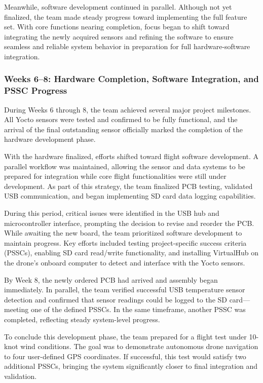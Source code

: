 \documentclass[12pt]{article}
\begin{document}
Meanwhile, software development continued in parallel. Although not yet finalized, the team made steady progress toward implementing the full feature set. With core functions nearing completion, focus began to shift toward integrating the newly acquired sensors and refining the software to ensure seamless and reliable system behavior in preparation for full hardware-software integration.

\subsubsection*{Weeks 6–8: Hardware Completion, Software Integration, and PSSC Progress}

During Weeks 6 through 8, the team achieved several major project milestones. All Yocto sensors were tested and confirmed to be fully functional, and the arrival of the final outstanding sensor officially marked the completion of the hardware development phase.

With the hardware finalized, efforts shifted toward flight software development. A parallel workflow was maintained, allowing the sensor and data systems to be prepared for integration while core flight functionalities were still under development. As part of this strategy, the team finalized PCB testing, validated USB communication, and began implementing SD card data logging capabilities.

During this period, critical issues were identified in the USB hub and microcontroller interface, prompting the decision to revise and reorder the PCB. While awaiting the new board, the team prioritized software development to maintain progress. Key efforts included testing project-specific success criteria (PSSCs), enabling SD card read/write functionality, and installing VirtualHub on the drone's onboard computer to detect and interface with the Yocto sensors.

By Week 8, the newly ordered PCB had arrived and assembly began immediately. In parallel, the team verified successful USB temperature sensor detection and confirmed that sensor readings could be logged to the SD card—meeting one of the defined PSSCs. In the same timeframe, another PSSC was completed, reflecting steady system-level progress.

To conclude this development phase, the team prepared for a flight test under 10-knot wind conditions. The goal was to demonstrate autonomous drone navigation to four user-defined GPS coordinates. If successful, this test would satisfy two additional PSSCs, bringing the system significantly closer to final integration and validation.
\end{document}
